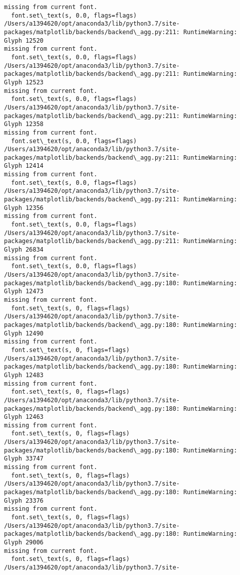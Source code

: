 \documentclass[11pt]{article}
\begin{document}
\begin{Verbatim}[commandchars=\\\{\}]
missing from current font.
  font.set\_text(s, 0.0, flags=flags)
/Users/a1394620/opt/anaconda3/lib/python3.7/site-
packages/matplotlib/backends/backend\_agg.py:211: RuntimeWarning: Glyph 12520
missing from current font.
  font.set\_text(s, 0.0, flags=flags)
/Users/a1394620/opt/anaconda3/lib/python3.7/site-
packages/matplotlib/backends/backend\_agg.py:211: RuntimeWarning: Glyph 12523
missing from current font.
  font.set\_text(s, 0.0, flags=flags)
/Users/a1394620/opt/anaconda3/lib/python3.7/site-
packages/matplotlib/backends/backend\_agg.py:211: RuntimeWarning: Glyph 12358
missing from current font.
  font.set\_text(s, 0.0, flags=flags)
/Users/a1394620/opt/anaconda3/lib/python3.7/site-
packages/matplotlib/backends/backend\_agg.py:211: RuntimeWarning: Glyph 12414
missing from current font.
  font.set\_text(s, 0.0, flags=flags)
/Users/a1394620/opt/anaconda3/lib/python3.7/site-
packages/matplotlib/backends/backend\_agg.py:211: RuntimeWarning: Glyph 12356
missing from current font.
  font.set\_text(s, 0.0, flags=flags)
/Users/a1394620/opt/anaconda3/lib/python3.7/site-
packages/matplotlib/backends/backend\_agg.py:211: RuntimeWarning: Glyph 26834
missing from current font.
  font.set\_text(s, 0.0, flags=flags)
/Users/a1394620/opt/anaconda3/lib/python3.7/site-
packages/matplotlib/backends/backend\_agg.py:180: RuntimeWarning: Glyph 12473
missing from current font.
  font.set\_text(s, 0, flags=flags)
/Users/a1394620/opt/anaconda3/lib/python3.7/site-
packages/matplotlib/backends/backend\_agg.py:180: RuntimeWarning: Glyph 12490
missing from current font.
  font.set\_text(s, 0, flags=flags)
/Users/a1394620/opt/anaconda3/lib/python3.7/site-
packages/matplotlib/backends/backend\_agg.py:180: RuntimeWarning: Glyph 12483
missing from current font.
  font.set\_text(s, 0, flags=flags)
/Users/a1394620/opt/anaconda3/lib/python3.7/site-
packages/matplotlib/backends/backend\_agg.py:180: RuntimeWarning: Glyph 12463
missing from current font.
  font.set\_text(s, 0, flags=flags)
/Users/a1394620/opt/anaconda3/lib/python3.7/site-
packages/matplotlib/backends/backend\_agg.py:180: RuntimeWarning: Glyph 33747
missing from current font.
  font.set\_text(s, 0, flags=flags)
/Users/a1394620/opt/anaconda3/lib/python3.7/site-
packages/matplotlib/backends/backend\_agg.py:180: RuntimeWarning: Glyph 23376
missing from current font.
  font.set\_text(s, 0, flags=flags)
/Users/a1394620/opt/anaconda3/lib/python3.7/site-
packages/matplotlib/backends/backend\_agg.py:180: RuntimeWarning: Glyph 29006
missing from current font.
  font.set\_text(s, 0, flags=flags)
/Users/a1394620/opt/anaconda3/lib/python3.7/site-

\end{Verbatim}
\end{document}

